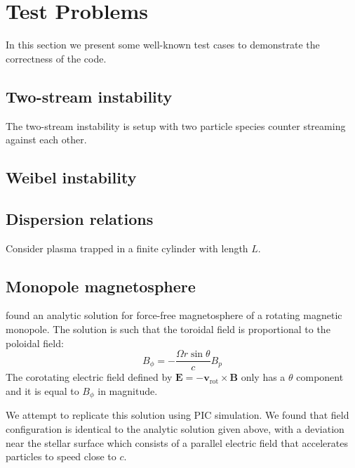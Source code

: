 \section{Test Problems}
\label{sec:test-problems}

In this section we present some well-known test cases to demonstrate the
correctness of the code.

\subsection{Two-stream instability}
\label{sec:test-two-stream}

The two-stream instability is setup with two particle species counter streaming
against each other.

\subsection{Weibel instability}
\label{sec:test-weibel}

\subsection{Dispersion relations}
\label{sec:test-dispersion}

Consider plasma trapped in a finite cylinder with length $L$.

\subsection{Monopole magnetosphere}
\label{sec:test-monopole}

\citet{michel_rotating_1973} found an analytic solution for force-free
magnetosphere of a rotating magnetic monopole. The solution is such that the
toroidal field is proportional to the poloidal field:
\begin{equation}
  \label{eq:monopole-toroidal}
  B_{\phi} = -\frac{\Omega r\sin\theta}{c} B_{p}
\end{equation}
The corotating electric field defined by $\mathbf{E} =
-\mathbf{v}_\mathrm{rot}\times \mathbf{B}$ only has a $\theta$ component and it
is equal to $B_{\phi}$ in magnitude.

We attempt to replicate this solution using PIC simulation. We found that field
configuration is identical to the analytic solution given above, with a
deviation near the stellar surface which consists of a parallel electric field
that accelerates particles to speed close to $c$.

